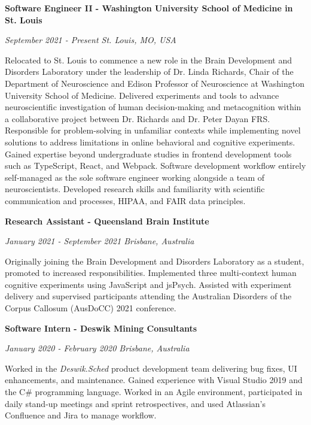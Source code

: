 \documentclass{article}
\begin{document}
  {\large\textbf{Software Engineer II - Washington University School of Medicine in St. Louis}}

  \textit{September 2021 - Present \hfill St. Louis, MO, USA}

  Relocated to St. Louis to commence a new role in the Brain Development and Disorders Laboratory under the leadership of Dr. Linda Richards, Chair of the Department of Neuroscience and Edison Professor of Neuroscience at Washington University School of Medicine. Delivered experiments and tools to advance neuroscientific investigation of human decision-making and metacognition within a collaborative project between Dr. Richards and Dr. Peter Dayan FRS. Responsible for problem-solving in unfamiliar contexts while implementing novel solutions to address limitations in online behavioral and cognitive experiments. Gained expertise beyond undergraduate studies in frontend development tools such as TypeScript, React, and Webpack. Software development workflow entirely self-managed as the sole software engineer working alongside a team of neuroscientists. Developed research skills and familiarity with scientific communication and processes, HIPAA, and FAIR data principles.

  \medbreak

  {\large\textbf{Research Assistant - Queensland Brain Institute}}

  \textit{January 2021 - September 2021 \hfill Brisbane, Australia}

  Originally joining the Brain Development and Disorders Laboratory as a student, promoted to increased responsibilities. Implemented three multi-context human cognitive experiments using JavaScript and jsPsych. Assisted with experiment delivery and supervised participants attending the Australian Disorders of the Corpus Callosum (AusDoCC) 2021 conference. 

  \medbreak

  {\large\textbf{Software Intern - Deswik Mining Consultants}}

  \textit{January 2020 - February 2020 \hfill Brisbane, Australia}

  Worked in the \textit{Deswik.Sched} product development team delivering bug fixes, UI enhancements, and maintenance. Gained experience with Visual Studio 2019 and the C\# programming language. Worked in an Agile environment, participated in daily stand-up meetings and sprint retrospectives, and used Atlassian's Confluence and Jira to manage workflow.

  \medbreak
\end{document}
